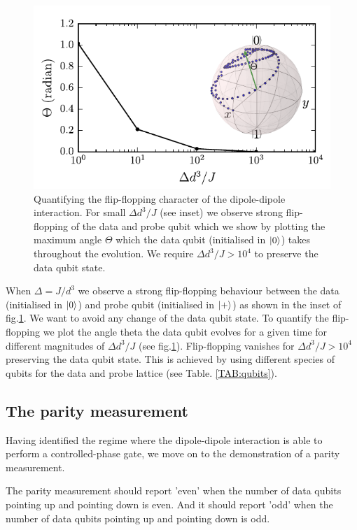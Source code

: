 \begin{figure}[H]
	\includegraphics[width=\linewidth]{../Figures/flip-flop}
	\caption{Quantifying the flip-flopping character of the dipole-dipole interaction. For small $\Delta d^3/ J$ (see inset) we observe strong flip-flopping of the data and probe qubit which we show by plotting the maximum angle $\Theta$ which the data qubit (initialised in $\ket{0}$) takes throughout the evolution. We require $\Delta d^3/ J > 10^4$ to preserve the data qubit state.}
	\label{FIG:flip-flop}
\end{figure}

When $\Delta = J/d^3$ we observe a strong flip-flopping behaviour between the data (initialised in $\ket{0}$) and probe qubit (initialised in $\ket{+}$) as shown in the inset of fig.\@ \ref{FIG:flip-flop}. We want to avoid any change of the data qubit state. To quantify the flip-flopping we plot the angle theta the data qubit evolves for a given time for different magnitudes of $\Delta d^3/ J$ (see fig.\@ \ref{FIG:flip-flop}). Flip-flopping vanishes for $\Delta d^3/ J > 10^4$ preserving the data qubit state. This is achieved by using different species of qubits for the data and probe lattice (see Table. \ref{TAB:qubits}).

\subsection{The parity measurement}
Having identified the regime where the dipole-dipole interaction is able to perform a controlled-phase gate, we move on to the demonstration of a parity measurement.

The parity measurement should report 'even' when the number of data qubits pointing up and pointing down is even. And it should report 'odd' when the number of data qubits pointing up and pointing down is odd.


